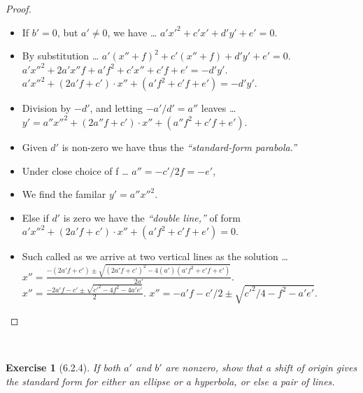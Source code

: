 \documentclass[12pt]{article}
\newcommand{\XB}{\color{black}}
\newcommand{\XBB}{\color{blue}}
\newcommand{\ds}{\displaystyle}
\theoremstyle{plain}
\newtheorem{ex}{Exercise}
\begin{document}
\begin{proof}
  \ \\

  \begin{itemize}
    \item If $ b' = 0 $, but $ a' \neq 0 $, we have \dots
    \subitem $ \ds a'x'^{2} + c'x' + d'y' + e' = 0 $.
    \item By substitution \dots 
    \subitem $ \ds a'(x'' + f)^{2} + c'(x'' + f) + d'y' + e' = 0 $.
    \subitem $ \ds a'x''^{2} + 2a'x''f + a'f^{2} + c'x'' + c'f + e' = - d'y' $.
    \subitem $ \ds a'x''^{2} + (2a'f + c') \cdot x'' + (a'f^{2} + c'f + e') = - d'y' $.
    \item Division by $ -d' $, and letting $ -a'/d' = a'' $ leaves \dots
    \subitem $ \ds y' = a''x''^{2} + (2a''f + c') \cdot x'' + (a''f^{2} + c'f + e') $.
    \item Given $ d' $ is non-zero we have thus the \textit{``standard-form parabola.''}
    \item Under close choice of f \dots 
    \subitem $ \ds a'' = - c'/2f = - e' $,
    \item We find the familar $ \ds y' = a''x''^{2} $.
    \item Else if $ d' $ is zero we have the \textit{``double line,''} of form 
    \subitem $ \ds a'x''^{2} + (2a'f + c') \cdot x'' + (a'f^{2} + c'f + e') = 0 $.
    \item Such called as we arrive at two vertical lines as the solution \dots
    \subitem $ \ds x'' = \frac{\ds -(2a'f + c') \pm \sqrt{(2a'f + c')^{2} - 4(a')(a'f^{2} + c'f + e')}}{2a'} $.
    \subitem $ \ds x'' = \frac{\ds -2a'f - c' \pm \sqrt{c'^{2} - 4f^{2} - 4a'e'}}{2} $.
    \subitem $ \ds x'' = \ds -a'f - c'/2 \pm \sqrt{c'^{2}/4 - f^{2} - a'e'} $.
  \end{itemize}

\end{proof}

\newpage


\XBB\hrulefill\XB \\
\begin{ex} [6.2.4]
  If both $ a' $ and $ b' $ are nonzero, 
  show that a shift of origin gives the standard form for either an ellipse or a hyperbola, or else a pair of lines.
\end{ex}
\XBB\hrulefill\XB \\
\end{document}
